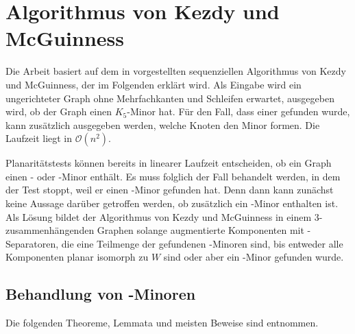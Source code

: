 \chapter{Algorithmus von Kezdy und McGuinness}
\label{cha:algorithmuskezdymcguinness}

Die Arbeit basiert auf dem in \cite{KeM92} vorgestellten sequenziellen Algorithmus von Kezdy und McGuinness, der im Folgenden erklärt wird.
Als Eingabe wird ein ungerichteter Graph ohne Mehrfachkanten und Schleifen erwartet, ausgegeben wird, ob der Graph einen $K_5$-Minor hat.
Für den Fall, dass einer gefunden wurde, kann zusätzlich ausgegeben werden, welche Knoten den Minor formen.
Die Laufzeit liegt in $\mathcal{O}(n^2)$.

Planaritätstests können bereits in linearer Laufzeit entscheiden, ob ein Graph einen \kf- oder \kdd-Minor enthält\cite{BoM04}.
Es muss folglich der Fall behandelt werden, in dem der Test stoppt, weil er einen \kdd-Minor gefunden hat.
Denn dann kann zunächst keine Aussage darüber getroffen werden, ob zusätzlich ein \kf-Minor enthalten ist.
Als Lösung bildet der Algorithmus von Kezdy und McGuinness in einem $3$-zusammenhängenden Graphen solange augmentierte Komponenten mit \dd-Separatoren, die eine Teilmenge der gefundenen \kdd-Minoren sind, bis entweder alle Komponenten planar \bzw isomorph zu $W$ sind oder aber ein \kf-Minor gefunden wurde.


\section{Behandlung von \kdd-Minoren}
\label{sec:behandlung_von_kdd_minoren}

Die folgenden Theoreme, Lemmata und meisten Beweise sind \cite{KeM92} entnommen.

